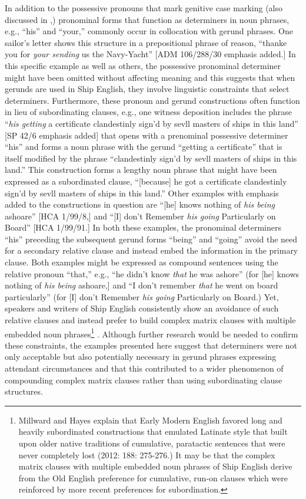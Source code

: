   In addition to the possessive pronouns that mark genitive case marking (also discussed in ,) pronominal forms that function as determiners in noun phrases, e.g., “his” and “your,” commonly occur in collocation with gerund phrases. One sailor’s letter shows this structure in a prepositional phrase of reason, “thanke you for \textit{your sending} us the Navy-Yacht” [ADM 106/288/30 emphasis added.] In this specific example as well as others, the possessive pronominal determiner might have been omitted without affecting meaning and this suggests that when gerunds are used in Ship English, they involve linguistic constraints that select determiners. Furthermore, these pronoun and gerund constructions often function in lieu of subordinating clauses, e.g., one witness deposition includes the phrase “\textit{his getting} a certificate clandestinly sign'd by sevll masters of ships in this land” [SP 42/6 emphasis added] that opens with a prenominal possessive determiner “his” and forms a noun phrase with the gerund “getting a certificate” that is itself modified by the phrase “clandestinly sign'd by sevll masters of ships in this land.” This construction forms a lengthy noun phrase that might have been expressed as a subordinated clause, “[because] he got a certificate clandestinly sign'd by sevll masters of ships in this land.” Other examples with emphasis added to the constructions in question are “[he] knows nothing of \textit{his being} ashoare” [HCA 1/99/8,] and “[I] don’t Remember \textit{his going} Particularly on Board” [HCA 1/99/91.] In both these examples, the pronominal determiners “his” preceding the subsequent gerund forms “being” and “going” avoid the need for a secondary relative clause and instead embed the information in the primary clause. Both examples might be expressed as compound sentences using the relative pronoun “that,” e.g., “he didn’t know \textit{that} he was ashore” (for [he] knows nothing of \textit{his being} ashoare,] and “I don’t remember \textit{that} he went on board particularly” (for [I] don’t Remember \textit{his going} Particularly on Board.) Yet, speakers and writers of Ship English consistently show an avoidance of such relative clauses and instead prefer to build complex matrix clauses with multiple embedded noun phrases\footnote{Millward and Hayes explain that Early Modern English favored long and heavily subordinated constructions that emulated Latinate style that built upon older native traditions of cumulative, paratactic sentences that were never completely lost (2012: 188: 275-276.) It may be that the complex matrix clauses with multiple embedded noun phrases of Ship English derive from the Old English preference for cumulative, run-on clauses which were reinforced by more recent preferences for subordination.} . Although further research would be needed to confirm these constraints, the examples presented here suggest that determiners were not only acceptable but also potentially necessary in gerund phrases expressing attendant circumstances and that this contributed to a wider phenomenon of compounding complex matrix clauses rather than using subordinating clause structures.

